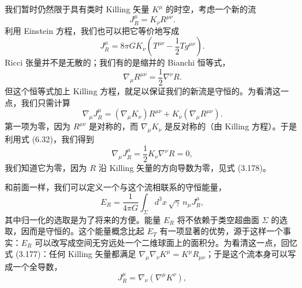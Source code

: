 我们暂时仍然限于具有类时 Killing 矢量 $K^{\mu}$ 的时空，考虑一个新的流
\begin{equation*}
J^{\mu}_{R} = K_\nu R^{\mu\nu}.
\tag{6.30}
\end{equation*}
利用 Einstein 方程，我们也可以把它等价地写成
\begin{equation*}
J^{\mu}_{R} = 8\pi G K_\nu\left(T^{\mu\nu}-\frac{1}{2}T g^{\mu\nu}\right).
\tag{6.31}
\end{equation*}
Ricci 张量并不是无散的；我们有的是缩并的 Bianchi 恒等式，
\begin{equation*}
\nabla_\mu R^{\mu\nu} = \frac{1}{2}\nabla^{\nu}R.
\tag{6.32}
\end{equation*}
但这个恒等式加上 Killing 方程，就足以保证我们的新流是守恒的。为看清这一点，我们只需计算
\begin{equation*}
\nabla_\mu J^{\mu}_{R} = (\nabla_\mu K_\nu)R^{\mu\nu} + K_\nu(\nabla_\mu R^{\mu\nu}).
\tag{6.33}
\end{equation*}
第一项为零，因为 $R^{\mu\nu}$ 是对称的，而 $\nabla_\mu K_\nu$ 是反对称的（由 Killing 方程）。于是利用式 (6.32)，我们得到
\begin{equation*}
\nabla_\mu J^{\mu}_{R} = \frac{1}{2}K_\nu\nabla^{\nu}R = 0,
\tag{6.34}
\end{equation*}
我们知道它为零，因为 $R$ 沿 Killing 矢量的方向导数为零，见式 (3.178)。

和前面一样，我们可以定义一个与这个流相联系的守恒能量，
\begin{equation*}
E_{R} = \frac{1}{4\pi G}\int_{\Sigma} d^{3}x\,\sqrt{\gamma}\, n_\mu J^{\mu}_{R},
\tag{6.35}
\end{equation*}
其中归一化的选取是为了将来的方便。能量 $E_{R}$ 将不依赖于类空超曲面 $\Sigma$ 的选取，因而是守恒的。这个能量概念比起 $E_{T}$ 有一项显著的优势，源于这样一个事实：$E_{R}$ 可以改写成空间无穷远处一个二维球面上的面积分。为看清这一点，回忆式 (3.177)：任何 Killing 矢量都满足 $\nabla_\mu\nabla_\nu K^{\mu}=K^{\mu}R_{\mu\nu}$；于是这个流本身可以写成一个全导数，
\begin{equation*}
J^{\mu}_{R} = \nabla_\nu(\nabla^{\mu}K^{\nu}),
\tag{6.36}
\end{equation*}
